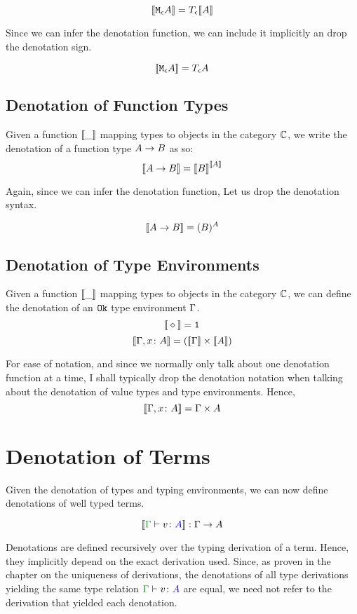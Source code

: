 \documentclass{report}
\begin{document}
$${\bf [\![}\texttt{M}_{\epsilon}{A}{\bf ]\!]} = T_{\epsilon}{{\bf [\![}A{\bf ]\!]}}$$

Since we can infer the denotation function, we can include it implicitly an drop the denotation sign.

$${\bf [\![}\texttt{M}_{\epsilon}{A}{\bf ]\!]} = T_{\epsilon}{A}$$

\subsection{Denotation of Function Types}
Given a function ${\bf [\![}\_{\bf ]\!]}$ mapping types to objects in the category $\mathbb{C}$, we write the denotation of a function type $A\rightarrow B$ as so:
$${\bf [\![}A\rightarrow B{\bf ]\!]} = {\bf [\![}B{\bf ]\!]}^{{\bf [\![}A{\bf ]\!]}}$$

Again, since we can infer the denotation function, Let us drop the denotation syntax.

$${\bf [\![}A\rightarrow B{\bf ]\!]} = (B)^A$$

\subsection{Denotation of Type Environments}
Given a function ${\bf [\![}\_{\bf ]\!]}$ mapping types to objects in the category $\mathbb{C}$, we can define the denotation of an $\texttt{Ok}$ type environment $\Gamma$.
$${\bf [\![}\diamond{\bf ]\!]} = \texttt{1}$$
$${\bf [\![}\Gamma, x\colon A{\bf ]\!]} = ({\bf [\![}\Gamma{\bf ]\!]}\times{\bf [\![}A{\bf ]\!]}) $$

For ease of notation, and since we normally only talk about one denotation function at a time, I shall typically drop the denotation notation when talking about the denotation of value types and type environments. Hence, $${\bf [\![}\Gamma, x\colon A{\bf ]\!]} = \Gamma \times A$$


\section{Denotation of Terms}
Given the denotation of types and typing environments, we can now define denotations of well typed terms.

$$\deno{\gtyperelation{v}{A}}: \G \rightarrow A$$

Denotations are defined recursively over the typing derivation of a term. Hence, they implicitly depend on the exact derivation used. Since, as proven in the chapter on the uniqueness of derivations, the denotations of all type derivations yielding the same type relation $\gtyperelation{v}{A}$ are equal, we need not refer to the derivation that yielded each denotation.
\end{document}
